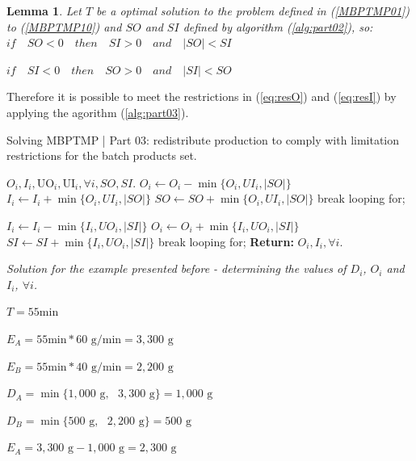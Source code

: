 \documentclass[authoryear,manuscript,12pt]{elsarticle}
\newtheorem{lemma}[theorem]{Lemma}
\begin{document}
\begin{lemma}
Let \(T\) be a optimal solution to the problem defined in (\ref{MBPTMP01}) to (\ref{MBPTMP10}) and $SO$ and $SI$ defined by algorithm (\ref{alg:part02}), so: \\

$if \quad SO < 0 \quad then \quad SI > 0 \quad and  \quad |SO| < SI$

$if \quad SI < 0 \quad then \quad SO > 0 \quad and  \quad |SI| < SO$

\end{lemma}

Therefore it is possible to meet the restrictions in (\ref{eq:resO}) and (\ref{eq:resI}) by applying the agorithm (\ref{alg:part03}).

\begin{algorithm}
\caption{Solving MBPTMP | Part 03: redistribute production to comply with limitation restrictions for the batch products set.}\label{alg:part03}
\begin{algorithmic}
\Require $O_i, I_i, \textrm{UO}_i, \textrm{UI}_i, \forall i, SO, SI$.
	\State $O_i \gets O_i - \min\{ O_i, UI_i, |SO|\}$
	\State $I_i \gets I_i + \min\{ O_i, UI_i, |SO|\}$
	\State $SO \gets SO + \min\{ O_i, UI_i, |SO|\}$
		break looping for;
	\EndIf
\EndFor
\EndIf

	\State $I_i \gets I_i - \min\{ I_i, UO_i, |SI|\}$
	\State $O_i \gets O_i + \min\{ I_i, UO_i, |SI|\}$
	\State $SI \gets SI + \min\{ I_i, UO_i, |SI|\}$
		break looping for;
	\EndIf
\EndFor
\EndIf
\State \textbf{Return:} $O_i, I_i, \forall i$.
\end{algorithmic}
\end{algorithm}

\emph{Solution for the example presented before - determining the values of $D_i$, $O_i$ and $I_i$, $\forall i$.}

$T = 55 \textrm{min}$

$E_A = 55 \textrm{min}* 60 \textrm{ g}/\textrm{min}  = 3,300 \textrm{ g}$

$E_B = 55 \textrm{min}* 40 \textrm{ g}/\textrm{min}  = 2,200 \textrm{ g}$

$D_A = \min \{1,000 \textrm{ g}, \textrm{ } 3,300 \textrm{ g}\} = 1,000 \textrm{ g} $

$D_B = \min \{500 \textrm{ g}, \textrm{ } 2,200 \textrm{ g}\} = 500 \textrm{ g} $

$E_A = 3,300 \textrm{ g} - 1,000 \textrm{ g} = 2,300 \textrm{ g}$
\end{document}
